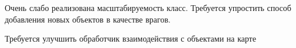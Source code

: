
\begin{DoxyRefList}
\item[\label{todo__todo000001}%
\hypertarget{todo__todo000001}{}%
Структуры данных \hyperlink{classGameObject_1_1Enemys}{Game\+Object\+:\+:Enemys} ]Очень слабо реализована масштабируемость класс. Требуется упростить способ добавления новых объектов в качестве врагов.  
\item[\label{todo__todo000002}%
\hypertarget{todo__todo000002}{}%
Глобальный \hyperlink{group__enemyHandler_ga95a06e0efaa583439b679f0b28419ba9}{move\+\_\+enemy} (\hyperlink{classGameObject}{Game\+Object} \&object, float time, std\+::minstd\+\_\+rand \&simple\+\_\+rand)]Требуется улучшить обработчик взаимодействия с объектами на карте
\end{DoxyRefList}